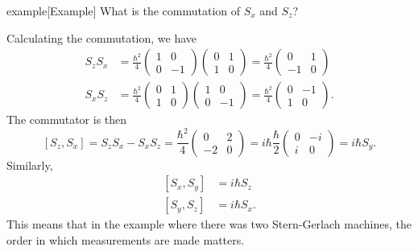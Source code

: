 \documentclass{article}
\begin{document}
\begin{callout}{example}[Example]
\label{example:s3-e5}
What is the commutation of $S_x$ and $S_z$?

Calculating the commutation, we have
\begin{align*}
    S_zS_x &= \frac{\hbar^2}{4}\begin{pmatrix}
        1 & 0 \\ 0 & -1
    \end{pmatrix}\begin{pmatrix}
        0 & 1 \\ 1 & 0
    \end{pmatrix} =\frac{\hbar^2}{4}\begin{pmatrix}
        0 & 1 \\ -1 & 0
    \end{pmatrix} \\
        S_xS_z &= \frac{\hbar^2}{4}\begin{pmatrix}
            0 & 1 \\ 1 & 0
        \end{pmatrix}\begin{pmatrix}
            1 & 0 \\ 0 & -1
        \end{pmatrix}=\frac{\hbar^2}{4}\begin{pmatrix}
            0 & -1 \\ 1 & 0
        \end{pmatrix}.
\end{align*}
The commutator is then
\[
    \left[ S_z, S_x \right]=S_zS_x-S_xS_z=\frac{\hbar^2}{4}\begin{pmatrix}
        0 & 2 \\ -2 & 0
    \end{pmatrix} = i \hbar \frac{\hbar}{2}\begin{pmatrix}
        0 & -i \\ i & 0
    \end{pmatrix}=i \hbar S_y.
\]
Similarly,
\begin{align*}
    \left[ S_x,S_y \right] &= i \hbar S_z \\
    \left[ S_y,S_z \right] &= i \hbar S_x.
\end{align*}
This means that in the example where there was two Stern-Gerlach machines, the order in which measurements are made matters.
\end{callout}
\end{document}
